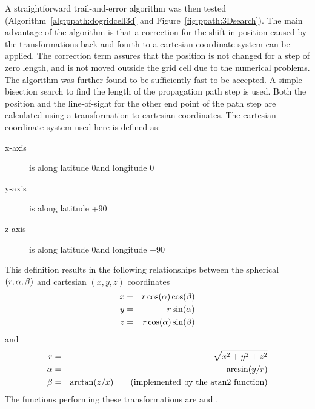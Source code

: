 A straightforward trail-and-error algorithm was then tested
(Algorithm~\ref{alg:ppath:dogridcell3d} and
Figure~\ref{fig:ppath:3Dsearch}). The main advantage of the algorithm
is that a correction for the shift in position caused by the
transformations back and fourth to a cartesian coordinate system can
be applied. The correction term assures that the position is not
changed for a step of zero length, and is not moved outside the grid
cell due to the numerical problems. The algorithm was further found to
be sufficiently fast to be accepted. A simple bisection search to find
the length of the propagation path step is used. Both the position and
the line-of-sight for the other end point of the path step are
calculated using a transformation to cartesian coordinates.  The
cartesian coordinate system used here is defined as:
\begin{description}
\item[x-axis] is along latitude 0\degree and longitude 0\degree
\item[y-axis] is along latitude +90\degree
\item[z-axis] is along latitude 0\degree and longitude +90\degree
\end{description}
This definition results in the following relationships between the
spherical $(r,\alpha,\beta)$ and cartesian $(x,y,z)$ coordinates
\begin{eqnarray}
  x &=& r \cos(\alpha) \cos(\beta) \nonumber \\
  y &=& r \sin(\alpha)            \\
  z &=& r \cos(\alpha) \sin(\beta) \nonumber
 \label{eq:ppath:sph2cart}
\end{eqnarray}
and
\begin{eqnarray}
 \label{eq:ppath:cart2sph}
  \Rds &=& \sqrt{x^2+y^2+z^2}  \nonumber  \\
  \Lat &=& \arcsin(y/\Rds)                \\
  \Lon &=& \arctan(z/x) \qquad \mathrm{(implemented\ by\ the\ atan2\ function)}
                               \nonumber
\end{eqnarray}
The functions performing these transformations are  and
.

